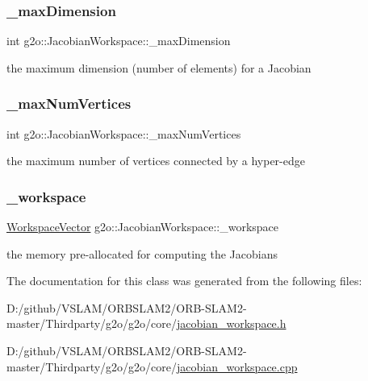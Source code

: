 \subsubsection{\texorpdfstring{\+\_\+max\+Dimension}{\_maxDimension}}
{\footnotesize\ttfamily int g2o\+::\+Jacobian\+Workspace\+::\+\_\+max\+Dimension\hspace{0.3cm}{\ttfamily [protected]}}



the maximum dimension (number of elements) for a Jacobian 

\mbox{\label{classg2o_1_1_jacobian_workspace_a640c84c19a739ce3116fc02c3a66b096}} 
\subsubsection{\texorpdfstring{\+\_\+max\+Num\+Vertices}{\_maxNumVertices}}
{\footnotesize\ttfamily int g2o\+::\+Jacobian\+Workspace\+::\+\_\+max\+Num\+Vertices\hspace{0.3cm}{\ttfamily [protected]}}



the maximum number of vertices connected by a hyper-\/edge 

\mbox{\label{classg2o_1_1_jacobian_workspace_af7dbaa3a651808e1bf3f876896bd1bfc}} 
\subsubsection{\texorpdfstring{\+\_\+workspace}{\_workspace}}
{\footnotesize\ttfamily \mbox{\hyperlink{classg2o_1_1_jacobian_workspace_aee9d767fa1208772a3de83732646e182}{Workspace\+Vector}} g2o\+::\+Jacobian\+Workspace\+::\+\_\+workspace\hspace{0.3cm}{\ttfamily [protected]}}



the memory pre-\/allocated for computing the Jacobians 



The documentation for this class was generated from the following files\+:\begin{DoxyCompactItemize}
\item 
D\+:/github/\+V\+S\+L\+A\+M/\+O\+R\+B\+S\+L\+A\+M2/\+O\+R\+B-\/\+S\+L\+A\+M2-\/master/\+Thirdparty/g2o/g2o/core/\mbox{\hyperlink{jacobian__workspace_8h}{jacobian\+\_\+workspace.\+h}}\item 
D\+:/github/\+V\+S\+L\+A\+M/\+O\+R\+B\+S\+L\+A\+M2/\+O\+R\+B-\/\+S\+L\+A\+M2-\/master/\+Thirdparty/g2o/g2o/core/\mbox{\hyperlink{jacobian__workspace_8cpp}{jacobian\+\_\+workspace.\+cpp}}\end{DoxyCompactItemize}
